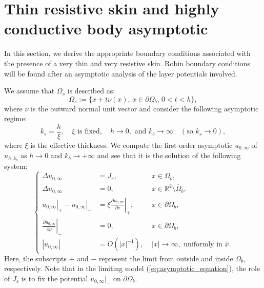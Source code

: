 \section{Thin resistive skin and highly conductive body asymptotic}

\label{sub:BC-derivation}


In this section,  we derive the appropriate boundary conditions
associated with the presence of a very thin and very resistive
skin. Robin boundary conditions will be found after an asymptotic
analysis of the layer potentials involved.

We assume that $\Omega_{s}$ is described as:
\[
\Omega_{s}:=\big\{ x +t\nu(x),\,
x\in\partial\Omega_{b},\,0<t<h\big\},
\]
 where $\nu$ is the outward normal unit vector and consider the following asymptotic regime:
\begin{equation} \label{assumpk}
k_s = \frac{h}{\xi}, \quad \xi \mbox{ is fixed}, \quad
h\rightarrow0, \mbox{ and }k_{b}\rightarrow\infty \quad
(\mbox{so } k_s \rightarrow 0),
\end{equation}
where $\xi$ is the effective thickness. We compute the first-order
asymptotic $u_{0,\infty}$ of $u_{h,k_b}$ as $h
\rightarrow 0$ and $k_b\rightarrow +\infty$ and see that it is the
solution of the following system:
\begin{equation}
\left\{ \begin{alignedat}{2}\Delta u_{0,\infty} & ={J_s}, & \,\, x\in\Omega_{b},\\
\Delta u_{0,\infty} & =0, & \,\, x\in\mathbb{R}^{2}\setminus\overline{\Omega}_{b},\\
\left.u_{0,\infty}\right|_{+}-\left.u_{0,\infty}\right|_{-} & =\xi\left.\frac{\partial u_{0,\infty}}{\partial\nu}\right|_{+}, & \,\, x\in\partial\Omega_{b},\\
\left.\frac{\partial u_{0,\infty}}{\partial\nu}\right|_{-} & =0, & \,\, x\in \partial \Omega_{b},\\
\left|u_{0,\infty}\right| & = {O}(\left|x\right|^{-1}), &
\,\,\left|x\right|\rightarrow\infty,\text{ uniformly in }\hat{x}.
\end{alignedat}
\right.\label{eq:asymptotic_equation}
\end{equation}
Here, the subscripts $+$ and $-$ represent the limit from outside
and inside $\Omega_b$, respectively.  Note that in the limiting
model (\ref{eq:asymptotic_equation}), the role of $J_s$ is to fix
the potential $ u_{0,\infty} \big|_{-}$ on $\partial \Omega_{b}$.

